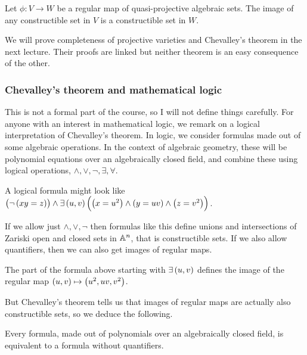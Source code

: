 \begin{theorem}
\label{thm:chevalleytheorem}
Let $ \phi : V \to W $ be a regular map of quasi-projective algebraic sets. The image of any constructible set in $ V $ is a constructible set in $ W $.
\end{theorem}

We will prove completeness of projective varieties and Chevalley's theorem in the next lecture. Their proofs are linked but neither theorem is an easy consequence of the other.

\subsubsection{Chevalley's theorem and mathematical logic}

This is not a formal part of the course, so I will not define things carefully. For anyone with an interest in mathematical logic, we remark on a logical interpretation of Chevalley's theorem. In logic, we consider formulas made out of some algebraic operations. In the context of algebraic geometry, these will be polynomial equations over an algebraically closed field, and combine these using logical operations, $ \land, \lor, \lnot, \exists, \forall $.

\begin{example*}
A logical formula might look like $ \br{\lnot\br{xy = z}} \land \exists\br{u, v}\br{\br{x = u^2} \land \br{y = uv} \land \br{z = v^2}} $.
\end{example*}

If we allow just $ \land, \lor, \lnot $ then formulas like this define unions and intersections of Zariski open and closed sets in $ \AA^n $, that is constructible sets. If we also allow quantifiers, then we can also get images of regular maps.

\begin{example*}
The part of the formula above starting with $ \exists\br{u, v} $ defines the image of the regular map $ \br{u, v} \mapsto \br{u^2, uv, v^2} $.
\end{example*}

But Chevalley's theorem tells us that images of regular maps are actually also constructible sets, so we deduce the following.

\begin{fact*}
Every formula, made out of polynomials over an algebraically closed field, is equivalent to a formula without quantifiers.
\end{fact*}

